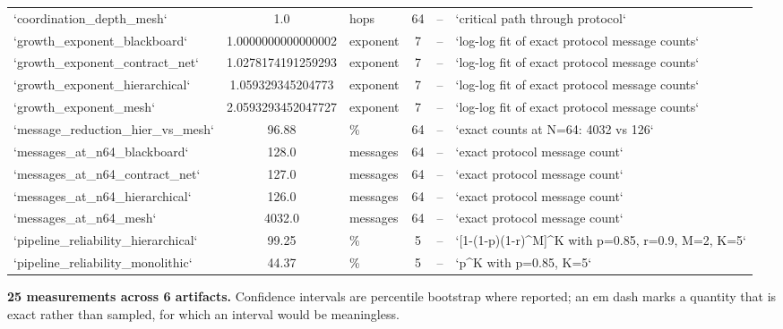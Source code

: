 \documentclass{article}
\begin{document}
\begin{table}[htbp]
{\begin{tabular}{lclcll}
`coordination\_depth\_mesh` & 1.0 & hops & 64 & -- & `critical path through protocol` \\
`growth\_exponent\_blackboard` & 1.0000000000000002 & exponent & 7 & -- & `log-log fit of exact protocol message counts` \\
`growth\_exponent\_contract\_net` & 1.0278174191259293 & exponent & 7 & -- & `log-log fit of exact protocol message counts` \\
`growth\_exponent\_hierarchical` & 1.059329345204773 & exponent & 7 & -- & `log-log fit of exact protocol message counts` \\
`growth\_exponent\_mesh` & 2.0593293452047727 & exponent & 7 & -- & `log-log fit of exact protocol message counts` \\
`message\_reduction\_hier\_vs\_mesh` & 96.88 & \% & 64 & -- & `exact counts at N=64: 4032 vs 126` \\
`messages\_at\_n64\_blackboard` & 128.0 & messages & 64 & -- & `exact protocol message count` \\
`messages\_at\_n64\_contract\_net` & 127.0 & messages & 64 & -- & `exact protocol message count` \\
`messages\_at\_n64\_hierarchical` & 126.0 & messages & 64 & -- & `exact protocol message count` \\
`messages\_at\_n64\_mesh` & 4032.0 & messages & 64 & -- & `exact protocol message count` \\
`pipeline\_reliability\_hierarchical` & 99.25 & \% & 5 & -- & `[1-(1-p)(1-r)^M]^K with p=0.85, r=0.9, M=2, K=5` \\
`pipeline\_reliability\_monolithic` & 44.37 & \% & 5 & -- & `p^K with p=0.85, K=5` \\
\bottomrule
\end{tabular}}
\end{table}

\textbf{25 measurements across 6 artifacts.} Confidence intervals are percentile bootstrap where reported; an em dash marks a quantity that is exact rather than sampled, for which an interval would be meaningless.
\end{document}
